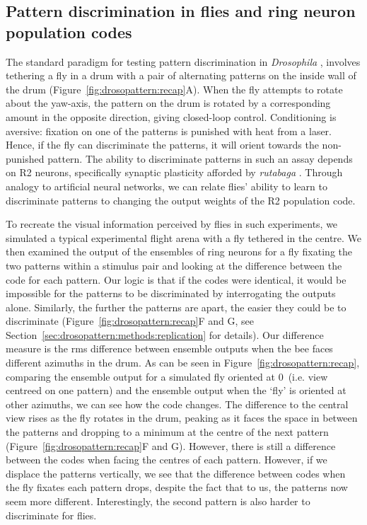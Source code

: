 \subsection{Pattern discrimination in flies and ring neuron population codes}
\label{sec:drosopattern:results:pattern}

The standard paradigm for testing pattern discrimination in \emph{Drosophila} \cite{Dill1993,Ernst1999,Liu2006,Pan2009}, involves tethering a fly in a drum with a pair of alternating patterns on the inside wall of the drum (Figure~\ref{fig:drosopattern:recap}A).
When the fly attempts to rotate about the yaw-axis, the pattern on the drum is rotated by a corresponding amount in the opposite direction, giving closed-loop control.
Conditioning is aversive: fixation on one of the patterns is punished with heat from a laser.
Hence, if the fly can discriminate the patterns, it will orient towards the non-punished pattern. The ability to discriminate patterns in such an assay depends on R2 neurons, specifically synaptic plasticity afforded by \emph{rutabaga} \cite{Ernst1999,Liu2006,Wang2008,Pan2009}. Through analogy to artificial neural networks, we can relate flies' ability to learn to discriminate patterns to changing the output weights of the R2 population code. 

To recreate the visual information perceived by flies in such experiments, we simulated a typical experimental flight arena with a fly tethered in the centre. We then examined the output of the ensembles of ring neurons for a fly fixating the two patterns within a stimulus pair and looking at the difference between the code for each pattern. Our logic is that if the codes were identical, it would be impossible for the patterns to be discriminated by interrogating the outputs alone. Similarly, the further the patterns are apart, the easier they could be to discriminate (Figure~\ref{fig:drosopattern:recap}F and G, see Section~\ref{sec:drosopattern:methods:replication} for details). Our difference measure is the \ac{rms} difference between ensemble outputs when the bee faces different azimuths in the drum. As can be seen in Figure~\ref{fig:drosopattern:recap}, comparing the ensemble output for a simulated fly oriented at 0\degree\ (i.e. view centreed on one pattern) and the ensemble output when the `fly' is oriented at other azimuths, we can see how the code changes. The difference to the central view rises as the fly rotates in the drum, peaking as it faces the space in between the patterns and dropping to a minimum at the centre of the next pattern (Figure~\ref{fig:drosopattern:recap}F and G). However, there is still a difference between the codes when facing the centres of each pattern. However, if we displace the patterns vertically, we see that the difference between codes when the fly fixates each pattern drops, despite the fact that to us, the patterns now seem more different. Interestingly, the second pattern is also harder to discriminate for flies.

